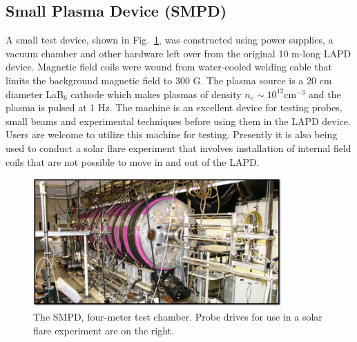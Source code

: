 \documentclass[11pt]{article}
\begin{document}
\subsection{Small Plasma Device (SMPD)}
A small test device, shown in Fig.\ \ref{fig:smpd}, was constructed using power supplies, a vacuum chamber and other hardware left over from the original 10 m-long LAPD device.  Magnetic field coils were wound from water-cooled welding cable that limits the background magnetic field to 300 G.  The plasma source is a 20 cm diameter LaB$_{6}$ cathode which makes plasmas of density $n_{e}\sim 10^{12}$cm$^{-3}$  and the plasma is pulsed at 1 Hz.  The machine is an excellent device for testing probes, small beams and experimental techniques before using them in the LAPD device.  Users are welcome to utilize this machine for testing.  Presently it is also being used to conduct a solar flare experiment that involves installation of internal field coils that are not possible to move in and out of the LAPD.
\begin{figure}[htbp] %
   \centering
   \includegraphics[width=0.85\textwidth]{smpd.jpg} 
   \caption{The SMPD, four-meter test chamber.  Probe drives for use in a solar flare experiment are on the right.}
   \label{fig:smpd}
\end{figure}
\end{document}
